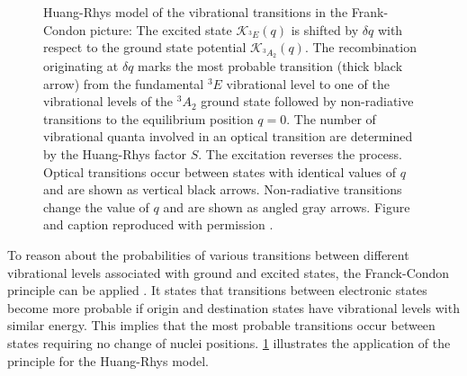    \begin{figure}[htbp]
     \centering
     \caption[Huang-Rhys model of vibrational transitions]{Huang-Rhys model of the vibrational transitions in the Frank-Condon picture: The excited state $\mathcal{K}_{{}^{3}E}(q)$ is shifted by $\delta q$ with respect to the ground state potential $\mathcal{K}_{{}^{3}A_{2}}(q)$. The recombination originating at $\delta q$ marks the most probable transition (thick black arrow) from the fundamental ${}^{3}E$ vibrational level to one of the vibrational levels of the ${}^{3}A_{2}$ ground state followed by non-radiative transitions to the equilibrium position $q = 0$. The number of vibrational quanta involved in an optical transition are determined by the Huang-Rhys factor $S$. The excitation reverses the process. Optical transitions occur between states with identical values of $q$ and are shown as vertical black arrows. Non-radiative transitions change the value of $q$ and are shown as angled gray arrows. Figure and caption reproduced with permission \cite{Riedrich-moller2014}.}
     \label{fig::huang_rhys_model}
   \end{figure}

   To reason about the probabilities of various transitions between different vibrational levels associated with ground and excited states, the Franck-Condon principle can be applied \cite{J.Franck: Elementary processes of photochemical reactions, E. U. Condon: A Theory of Intensity Distribution in Band Systems}. It states that transitions between electronic states become more probable if origin and destination states have vibrational levels with similar energy. This implies that the most probable transitions occur between states requiring no change of nuclei positions. \cref{fig::huang_rhys_model} illustrates the application of the principle for the Huang-Rhys model.

